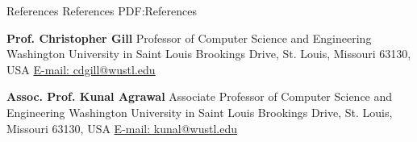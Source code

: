 \documentclass[letterpaper,MMMyyyy,nonstopmode]{simpleresumecv}
\begin{document}
\begin{Body}
\Section
{References}
{References}
{PDF:References}

\BulletItem
\textbf{Prof. Christopher Gill}
\newline
Professor of Computer Science and Engineering
\newline
Washington University in Saint Louis
 Brookings Drive, St. Louis, Missouri 63130, USA
\newline
\href{mailto:cdgill@wustl.edu}
{E-mail: cdgill@wustl.edu}

\BigGap
\BulletItem
\textbf{Assoc. Prof. Kunal Agrawal}
\newline
Associate Professor of Computer Science and Engineering
\newline
Washington University in Saint Louis
 Brookings Drive, St. Louis, Missouri 63130, USA
\newline
\href{mailto:kunal@wustl.edu}
{E-mail: kunal@wustl.edu}

\begin{comment}

\Section
{Multilingual Unicode Examples}
{Multilingual Unicode Examples}
{PDF:MultilingualUnicodeExamples}

\BulletItem
Assortment of unicode characters from
\href{http://www.ltg.ed.ac.uk/~richard/unicode-sample.html}
{\url{http://www.ltg.ed.ac.uk/~richard/unicode-sample.html}}

\begin{Detail}
\Item
\textbf{Latin Extended-A}
Ā ā Ă ă Ą ą Ć ć Ĉ ĉ Ċ ċ Č č Ď ď Đ đ Ē ē Ĕ ĕ Ė ė Ę ę Ě ě Ĝ ĝ Ğ ğ Ġ ġ Ģ ģ Ĥ ĥ Ħ ħ Ĩ ĩ Ī ī Ĭ ĭ Į į İ ı Ĳ ĳ Ĵ ĵ
\textbf{Latin Extended-B}
ƀ Ɓ Ƃ ƃ Ƅ ƅ Ɔ Ƈ ƈ Ɖ Ɗ Ƌ ƌ ƍ Ǝ Ə Ɛ Ƒ ƒ Ɠ Ɣ ƕ Ɩ Ɨ Ƙ ƙ ƚ ƛ Ɯ Ɲ ƞ Ɵ Ơ ơ Ƣ ƣ Ƥ ƥ Ʀ Ƨ ƨ Ʃ ƪ ƫ Ƭ ƭ Ʈ Ư ư Ʊ Ʋ Ƴ ƴ Ƶ
\textbf{Latin Extended Additional}
Ḁ ḁ Ḃ ḃ Ḅ ḅ Ḇ ḇ Ḉ ḉ Ḋ ḋ Ḍ ḍ Ḏ ḏ Ḑ ḑ Ḓ ḓ Ḕ ḕ Ḗ ḗ Ḙ ḙ Ḛ ḛ Ḝ ḝ Ḟ ḟ Ḡ ḡ Ḣ ḣ Ḥ ḥ Ḧ ḧ Ḩ ḩ Ḫ ḫ Ḭ ḭ Ḯ ḯ Ḱ ḱ Ḳ ḳ Ḵ ḵ
\textbf{Greek}
ʹ ͵ ͺ ; ΄ ΅ Ά · Έ Ή Ί Ό Ύ Ώ ΐ Α Β Γ Δ Ε Ζ Η Θ Ι Κ Λ Μ Ν Ξ Ο Π Ρ Σ Τ Υ Φ Χ Ψ Ω Ϊ Ϋ ά έ ή ί ΰ α β γ δ ε ζ η θ
\textbf{Cyrillic}
Ё Ђ Ѓ Є Ѕ І Ї Ј Љ Њ Ћ Ќ Ў Џ А Б В Г Д Е Ж З И Й К Л М Н О П Р С Т У Ф Х Ц Ч Ш Щ Ъ Ы Ь Э Ю Я а б в г д е ж з
\textbf{Hebrew}
א ב ג ד ה ו ז ח ט י ך כ ל ם מ ן נ ס ע ף פ ץ צ ק ר ש ת װ ױ ײ ֝ ֞ ֟ ֠ ֡ ֣ ֤ ֥ ֦ ֧ ֨ ֩ ֪ ֫ ֬ ֭ ֮ ֯ ְ ֱ ֒ ֓ ֔
\textbf{Armenian}
{\UseSecondaryFont
Ա Բ Գ Դ Ե Զ Է Ը Թ Ժ Ի Լ Խ Ծ Կ Հ Ձ Ղ Ճ Մ Յ Ն Շ Ո Չ Պ Ջ Ռ Ս Վ Տ Ր Ց Ւ Փ Ք Օ Ֆ ՙ ՚ ՛ ՜ ՝ ՞ ՟ ա բ գ դ ե զ}
\textbf{Thai}
{\UseSecondaryFont
ก ข ฃ ค ฅ ฆ ง จ ฉ ช ซ ฌ ญ ฎ ฏ ฐ ฑ ฒ ณ ด ต ถ ท ธ น บ ป ผ ฝ พ ฟ ภ ม ย ร ฤ ล ฦ ว ศ ษ ส ห ฬ อ ฮ ฯ ะ ั า ำ ิ}
\end{Detail}



\end{comment}
\end{Body}
\end{document}
